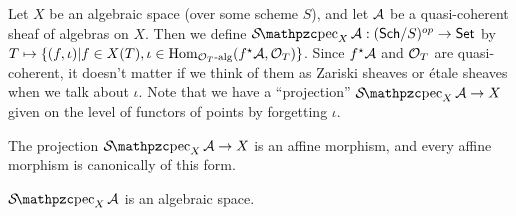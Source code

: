 
 \begin{definition}
   Let $X$ be an algebraic space (over some scheme $S$), and let $\mathcal{A}$ be a quasi-coherent
   sheaf of algebras on $X$. Then we define $\Spec_X \A:(\sch/S)^{op}\to \set$ by
   $T\mapsto \{(f,\iota)|f\in X(T), \iota\in \operatorname{Hom}_{\mathcal{O}_T\text{-alg}}(f^\star\mathcal{A}, \mathcal{O}_T) \}$.
   Since $f^\star \mathcal{A}$ and $\mathcal{O}_T$ are quasi-coherent, it doesn't matter if we think of
   them as Zariski sheaves or \'etale sheaves when we talk about $\iota$. Note that we
   have a ``projection'' $\Spec_X \A\to X$ given on the level of functors of points by
   forgetting $\iota$.
 \end{definition}
 The projection $\Spec_X \A\to X$ is an affine morphism, and every affine morphism is
 canonically of this form. 
 \begin{proposition}
   $\Spec_X \A$ is an algebraic space.
 \end{proposition}
